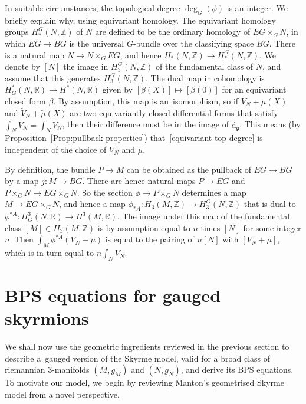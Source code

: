\documentclass[pdftex]{sigma}
\newcommand{\g}{{\mathfrak{g}}}
\newcommand{\R}{{\mathbb{R}}}
\newcommand{\Z}{{\mathbb{Z}}}
\newcommand{\1}{{\mathbb{1}}}
\def \d{\mathrm{d}}
\numberwithin{equation}{section}
\begin{document}
In suitable circumstances, the topological degree $\deg_G(\phi)$ is an integer. We briefly explain why, using equivariant homology. The equivariant homology groups $H^G_\ast(N,\Z)$ of $N$ are defined to be the ordinary homology of $EG\times_G N$, in which $EG\to BG$ is the universal $G$-bundle over the classifying space $BG$. There is a natural map $N\to N\times_G EG$, and hence $H_\ast(N,\Z)\to H^G_\ast(N,\Z)$. We denote by $[N]$ the image in $H^G_3(N,\Z)$ of the fundamental class of $N$, and assume that this generates $H^G_3(N,\Z)$. The dual map in cohomology is $H^\ast_G(N,\R)\to H^\ast(N,\R)$ given by $[\beta(X)]\mapsto[\beta(0)]$ for an equivariant closed form $\beta$. By assumption, this map is an~isomorphism, so if $V_N+\mu(X)$ and $\tilde{V}_N+\tilde{\mu}(X)$ are two equivariantly closed differential forms that satisfy $\int_NV_N=\int_N\tilde{V}_N$, then their difference must be in the image of $\d_\g$. This means (by Proposition~\ref{Prop:pullback-properties}) that~\eqref{equivariant-top-degree} is independent of the choice of $V_N$ and $\mu$.

By definition, the bundle $P\to M$ can be obtained as the pullback of $EG\to BG$ by a map $j\colon M\to BG$. There are hence natural maps $P\to EG$ and $P\times_G N \to EG\times_G N$. So the section $\phi\to P\times_G N$ determines a map $M\to EG\times_G N$, and hence a map $\phi_{\ast A}\colon H_3(M,\Z)\to H_3^G(N,\Z)$ that is dual to $\phi^{\ast A}\colon H^3_G(N,\R)\to H^3(M,\R)$. The image under this map of the fundamental class $[M]\in H_3(M,\Z)$ is by assumption equal to $n$ times $[N]$ for some integer $n$. Then $\int_M\phi^{\ast A}(V_N+\mu)$ is equal to the pairing of $n[N]$ with $[V_N+\mu]$, which is in turn equal to $n\int_N V_N$.

\section{BPS equations for gauged skyrmions}\label{sec:BPS-eqns}
We shall now use the geometric ingredients reviewed in the previous section to describe a~gauged version of the Skyrme model, valid for a broad class of riemannian 3-manifolds $(M,g_M)$ and $(N,g_N)$, and derive its BPS equations. To motivate our model, we begin by reviewing Manton's geometrised Skyrme model \cite{Manton1987geometry} from a novel perspective.
\end{document}
